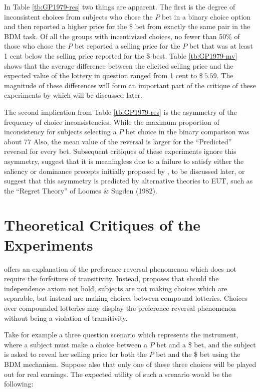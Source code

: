 \documentclass[11pt,a4paper]{report}
\newcommand{\money}[1]{$\$\!\:#1$}          %
\begin{document}
In Table \ref{tb:GP1979-res} two things are apparent.
The first is the degree of inconsistent choices from subjects who chose the $P$ bet in a binary choice option and then reported a higher price for the \$ bet from exactly the same pair in the BDM task.
Of all the groups with incentivized choices, no fewer than 50\% of those who chose the $P$ bet reported a selling price for the $P$ bet that was at least 1 cent below the selling price reported for the \$ best.
Table \ref{tb:GP1979-mv} shows that the average difference between the elicited selling price and the expected value of the lottery in question ranged from 1 cent to \money{5.59}.
The magnitude of these differences will form an important part of the critique of these experiments by \textcite{Harrison1989, Harrison1992} which will be discussed later.

The second implication from Table \ref{tb:GP1979-res} is the asymmetry of the frequency of choice inconsistencies.
While the maximum proportion of inconsistency for subjects selecting a $P$ bet choice in the binary comparison was about 77%
Also, the  mean value of the reversal is larger for the \enquote{Predicted} reversal for every bet.
Subsequent critiques of these experiments ignore this asymmetry, suggest that it is meaningless due to a failure to satisfy either the saliency or dominance precepts initially proposed by \textcite{Smith1982}, to be discussed later, or suggest that this asymmetry is predicted by alternative theories to EUT, such as the \enquote{Regret Theory} of  Loomes \& Sugden (1982).

\section{Theoretical Critiques of the \texorpdfstring{\textcite{Grether1979}}{Grether \& Plott (1979)} Experiments}

\textcite{Holt1986} offers an explanation of the preference reversal phenomenon which does not require the forfeiture of transitivity.
Instead, \textcite{Holt1986} proposes that should the independence axiom not hold, subjects are not making choices which are separable, but instead are making choices between compound lotteries.
Choices over compounded lotteries may display the preference reversal phenomenon without being a violation of transitivity.

Take for example a three question scenario which represents the \textcite{Grether1979} instrument, where a subject must make a choice between a $P$ bet and a \$ bet, and the subject is asked to reveal her selling price for both the $P$ bet and the \$ bet using the BDM mechanism.
Suppose also that only one of these three choices will be played out for real earnings.
The expected utility of such a scenario would be the following:
\end{document}
